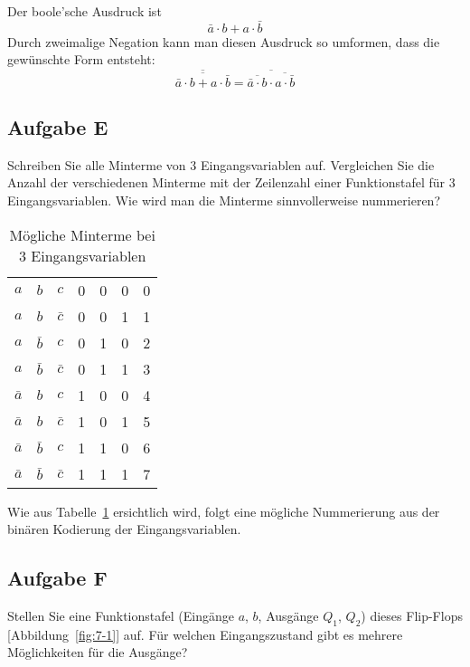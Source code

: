 Der boole'sche Ausdruck ist 
\[
    \bar a \cdot b + a \cdot \bar b
\]
Durch zweimalige Negation kann man diesen Ausdruck so umformen, dass die
gewünschte Form entsteht:
\[
    \overline{\overline{\bar a \cdot b + a \cdot \bar b}} =
    \overline{\overline{\bar a \cdot b} \cdot \overline{a \cdot \bar b}} 
\]

\FloatBarrier
\subsection{Aufgabe E}

\begin{problem}
    Schreiben Sie alle Minterme von 3 Eingangsvariablen auf. Vergleichen Sie
    die Anzahl der verschiedenen Minterme mit der Zeilenzahl einer
    Funktionstafel für 3 Eingangsvariablen. Wie wird man die Minterme
    sinnvollerweise nummerieren?
\end{problem}

\begin{table}
    \centering
        \begin{tabular}{ccc|ccc|c}
            $a$ & $b$ & $c$ & 0 & 0 & 0 & 0\\
            $a$ & $b$ & $\bar c$ & 0 & 0 & 1 & 1\\
            $a$ & $\bar b$ & $c$ & 0 & 1 & 0 & 2\\
            $a$ & $\bar b$ & $\bar c$ & 0 & 1 & 1 & 3\\
            $\bar a$ & $b$ & $c$ & 1 & 0 & 0 & 4\\
            $\bar a$ & $b$ & $\bar c$ & 1 & 0 & 1 & 5\\
            $\bar a$ & $\bar b$ & $c$ & 1 & 1 & 0 & 6\\
            $\bar a$ & $\bar b$ & $\bar c$ & 1 & 1 & 1 & 7\\
        \end{tabular}
        \caption{%
            Mögliche Minterme bei 3 Eingangsvariablen
        }
        \label{tab:Aufgabe_E}
\end{table}

Wie aus Tabelle~\ref{tab:Aufgabe_E} ersichtlich wird, folgt eine mögliche
Nummerierung aus der binären Kodierung der Eingangsvariablen.

\subsection{Aufgabe F}

\begin{problem}
    Stellen Sie eine Funktionstafel (Eingänge $a$, $b$, Ausgänge $Q_1$, $Q_2$)
    dieses Flip-Flops [Abbildung~\ref{fig:7-1}] auf. Für welchen
    Eingangszustand gibt es mehrere Möglichkeiten für die Ausgänge?
\end{problem}

